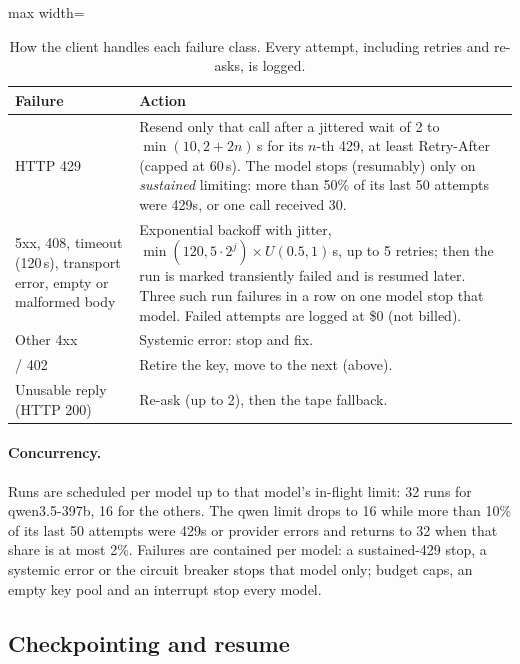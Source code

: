 \documentclass[11pt,letterpaper]{article}
\numberwithin{equation}{section}
\numberwithin{table}{section}
\numberwithin{figure}{section}
\numberwithin{algorithm}{section}
\begin{document}
\begin{table}[h]
\centering\small
\caption{How the client handles each failure class. Every attempt, including retries and re-asks, is logged.}
\label{tab:retries}
\begin{adjustbox}{max width=\linewidth}
\begin{tabularx}{\linewidth}{>{\raggedright\arraybackslash}p{4.3cm}X}
\toprule
Failure & Action \\
\midrule
HTTP 429 & Resend only that call after a jittered wait of 2 to $\min(10, 2+2n)$\,s for its $n$-th 429, at least Retry-After (capped at 60\,s). The model stops (resumably) only on \emph{sustained} limiting: more than 50\% of its last 50 attempts were 429s, or one call received 30. \\
5xx, 408, timeout (120\,s), transport error, empty or malformed body & Exponential backoff with jitter, $\min(120, 5\cdot2^{j})\times U(0.5,1)$\,s, up to 5 retries; then the run is marked transiently failed and is resumed later. Three such run failures in a row on one model stop that model. Failed attempts are logged at \$0 (not billed). \\
Other 4xx & Systemic error: stop and fix. \\
401 / 402 & Retire the key, move to the next (above). \\
Unusable reply (HTTP 200) & Re-ask (up to 2), then the tape fallback. \\
\bottomrule
\end{tabularx}
\end{adjustbox}
\end{table}

\paragraph{Concurrency.} Runs are scheduled per model up to that model's in-flight limit: 32 runs for qwen3.5-397b, 16 for the others. The qwen limit drops to 16 while more than 10\% of its last 50 attempts were 429s or provider errors and returns to 32 when that share is at most 2\%. Failures are contained per model: a sustained-429 stop, a systemic error or the circuit breaker stops that model only; budget caps, an empty key pool and an interrupt stop every model.

\subsection{Checkpointing and resume}
\end{document}
